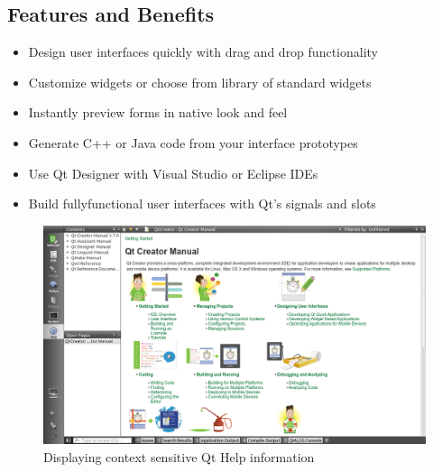 

\begin{small}
\subsection{\large Features and Benefits}
\end{small}
\begin{itemize}
\item Design user interfaces quickly with drag and drop functionality
\item Customize widgets or choose from library of standard widgets
\item Instantly preview forms in native look and feel
\item Generate C++ or Java code from your interface prototypes
\item Use Qt Designer with Visual Studio or Eclipse IDEs
\item Build fully­functional user interfaces with Qt’s signals and slots
\end{itemize}
\begin{figure}[htb]
\begin{center}
\includegraphics[scale=0.4]{images/Qtman.png}
\caption{ Displaying context sensitive Qt Help information}
\end{center}
\end{figure}